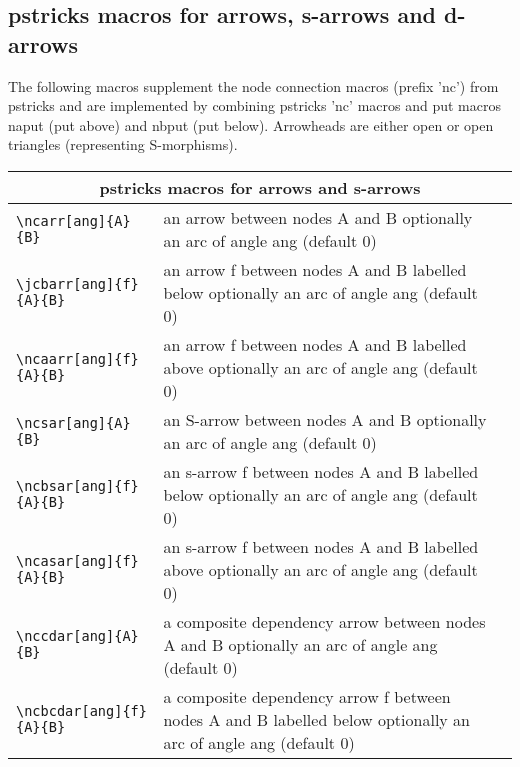 \documentclass[10pt,a4paper]{article}
\begin{document}
\subsection {pstricks macros for arrows, s-arrows and d-arrows}
The following macros supplement the node connection macros (prefix 'nc') from pstricks and are implemented by combining pstricks 'nc' macros and put macros naput (put above) and nbput (put below). Arrowheads are either open or open triangles (representing S-morphisms). \\
		\begin{tabular}{|l |  p{5cm} | c |}
		\hline
		\multicolumn{3}{|c|}{pstricks macros for arrows and s-arrows} \\
		   \hline	   
		   \verb!\ncarr[ang]{A}{B}! &  an arrow between nodes A and B optionally an arc of angle ang (default 0)
			&
			\\
		   \hline
		 	 \verb!\jcbarr[ang]{f}{A}{B}! & an arrow f between nodes A and B labelled below optionally an arc of angle ang (default 0)
			&
			\\
		 	 \hline
		 	 \verb!\ncaarr[ang]{f}{A}{B}! & an arrow f between nodes A and B labelled above optionally an arc of angle ang (default 0)
			&
			\\
			\hline	   
		   \verb!\ncsar[ang]{A}{B}! &  an S-arrow between nodes A and B optionally an arc of angle ang (default 0)
			&
			\raisebox{-0.6cm}{$
\begin{array} {c}
\Rnode{A}{A} \\ [0.6cm]
\Rnode{B}{B}
\end{array}$\ncsar{A}{B}} \\
		 	 \hline			
		 	 \verb!\ncbsar[ang]{f}{A}{B}! & an s-arrow f between nodes A and B labelled below optionally an arc of angle ang (default 0)
			&
			\\
		 	 \hline
		 	 \verb!\ncasar[ang]{f}{A}{B}! & an s-arrow f between nodes A and B labelled above optionally an arc of angle ang (default 0)
			&
			\\
						\hline	   
		   \verb!\nccdar[ang]{A}{B}! &  a composite dependency arrow between nodes A and B optionally an arc of angle ang (default 0)
			&
			\raisebox{-0.75cm}{$
\begin{array} {c}
\Rnode{A}{A} \\ [0.75cm]
\Rnode{B}{B}
\end{array}$\nccdar{A}{B}} \\
		 	 \hline			
		 	 \verb!\ncbcdar[ang]{f}{A}{B}! & a composite dependency arrow f between nodes A and B labelled below optionally an arc of angle ang (default 0)

\end{tabular}
\end{document}
